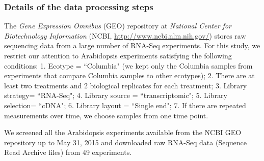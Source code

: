 \documentclass[letterpaper,12pt]{article}
\begin{document}
\subsubsection*{Details of the data processing steps}
The \textit{Gene Expression Omnibus} (GEO) repository at \textit{National
Center for Biotechnology Information} (NCBI,
\url{http://www.ncbi.nlm.nih.gov/}) stores raw sequencing data from a large
number of RNA-Seq experiments.  For this study, we restrict our attention to
Arabidopsis experiments satisfying the following conditions: 1.  Ecotype =
``Columbia" (we kept only the Columbia samples from experiments that compare
Columbia samples to other ecotypes); 2. There are at least two treatments and 2 biological replicates for each
treatment; 3. Library strategy= ``RNA-Seq"; 4.
Library source = ``transcriptomic"; 5.  Library selection= ``cDNA"; 6.  Library
layout = ``Single end"; 7. If there are repeated measurements over time, we choose samples from one time point. 

 We screened all the Arabidopsis experiments available from the NCBI
GEO repository up to May 31, 2015 and downloaded raw RNA-Seq data (Sequence Read Archive files)
from 49 experiments. %
\end{document}
